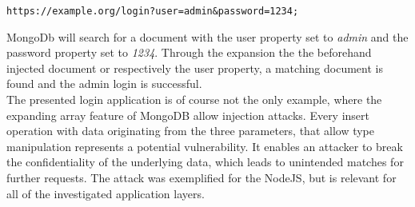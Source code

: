 \begin{lstlisting}[caption={MongoDB injection with NodeJS's query string module}, label={lst:ArrayExpandingAdminLogin}]
https://example.org/login?user=admin&password=1234;
\end{lstlisting}

MongoDb will search for a document with the user property set to \emph{admin} and the password property set to \emph{1234}. Through the expansion the the beforehand injected document or respectively the user property, a matching document is found and the admin login is successful.\\

The presented login application is of course not the only example, where the expanding array feature of MongoDB allow injection attacks. Every insert operation with data originating from the three parameters, that allow type manipulation represents a potential vulnerability. It enables an attacker to break the confidentiality of the underlying data, which leads to unintended matches for further requests. The attack was exemplified for the NodeJS, but is relevant for all of the investigated application layers. 

